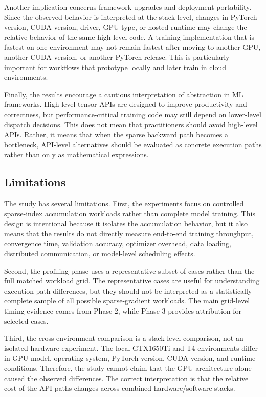 Another implication concerns framework upgrades and deployment portability. Since the observed behavior is interpreted at the stack level, changes in PyTorch version, CUDA version, driver, GPU type, or hosted runtime may change the relative behavior of the same high-level code. A training implementation that is fastest on one environment may not remain fastest after moving to another GPU, another CUDA version, or another PyTorch release. This is particularly important for workflows that prototype locally and later train in cloud environments.

Finally, the results encourage a cautious interpretation of abstraction in ML frameworks. High-level tensor APIs are designed to improve productivity and correctness, but performance-critical training code may still depend on lower-level dispatch decisions. This does not mean that practitioners should avoid high-level APIs. Rather, it means that when the sparse backward path becomes a bottleneck, API-level alternatives should be evaluated as concrete execution paths rather than only as mathematical expressions.

\subsection{Limitations}

The study has several limitations. First, the experiments focus on controlled sparse-index accumulation workloads rather than complete model training. This design is intentional because it isolates the accumulation behavior, but it also means that the results do not directly measure end-to-end training throughput, convergence time, validation accuracy, optimizer overhead, data loading, distributed communication, or model-level scheduling effects.

Second, the profiling phase uses a representative subset of cases rather than the full matched workload grid. The representative cases are useful for understanding execution-path differences, but they should not be interpreted as a statistically complete sample of all possible sparse-gradient workloads. The main grid-level timing evidence comes from Phase 2, while Phase 3 provides attribution for selected cases.

Third, the cross-environment comparison is a stack-level comparison, not an isolated hardware experiment. The local GTX1650Ti and T4 environments differ in GPU model, operating system, PyTorch version, CUDA version, and runtime conditions. Therefore, the study cannot claim that the GPU architecture alone caused the observed differences. The correct interpretation is that the relative cost of the API paths changes across combined hardware/software stacks.

